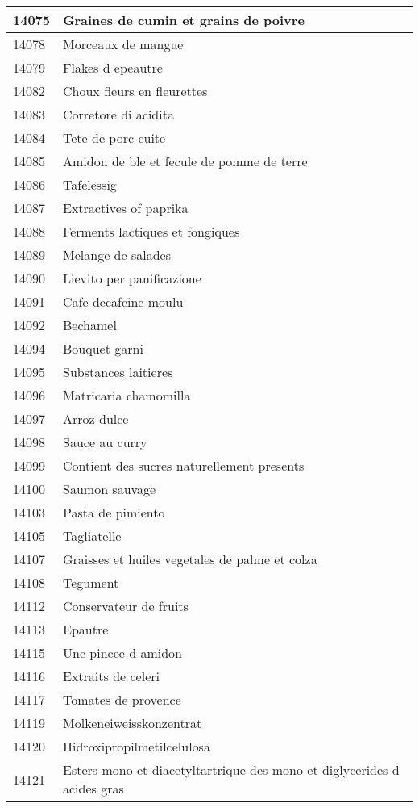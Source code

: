\begin{longtable}{|l|l|}
14075 & Graines de cumin et grains de poivre \\ \hline 
14078 & Morceaux de mangue \\ \hline 
14079 & Flakes d epeautre \\ \hline 
14082 & Choux fleurs en fleurettes \\ \hline 
14083 & Corretore di acidita \\ \hline 
14084 & Tete de porc cuite \\ \hline 
14085 & Amidon de ble et fecule de pomme de terre \\ \hline 
14086 & Tafelessig \\ \hline 
14087 & Extractives of paprika \\ \hline 
14088 & Ferments lactiques et fongiques \\ \hline 
14089 & Melange de salades \\ \hline 
14090 & Lievito per panificazione \\ \hline 
14091 & Cafe decafeine moulu \\ \hline 
14092 & Bechamel \\ \hline 
14094 & Bouquet garni \\ \hline 
14095 & Substances laitieres \\ \hline 
14096 & Matricaria chamomilla \\ \hline 
14097 & Arroz dulce \\ \hline 
14098 & Sauce au curry \\ \hline 
14099 & Contient des sucres naturellement presents \\ \hline 
14100 & Saumon sauvage \\ \hline 
14103 & Pasta de pimiento \\ \hline 
14105 & Tagliatelle \\ \hline 
14107 & Graisses et huiles vegetales de palme et colza \\ \hline 
14108 & Tegument \\ \hline 
14112 & Conservateur de fruits \\ \hline 
14113 & Epautre \\ \hline 
14115 & Une pincee d amidon \\ \hline 
14116 & Extraits de celeri \\ \hline 
14117 & Tomates de provence \\ \hline 
14119 & Molkeneiweisskonzentrat \\ \hline 
14120 & Hidroxipropilmetilcelulosa \\ \hline 
14121 & Esters mono et diacetyltartrique des mono et diglycerides d acides gras \\ \hline 

\end{longtable}
